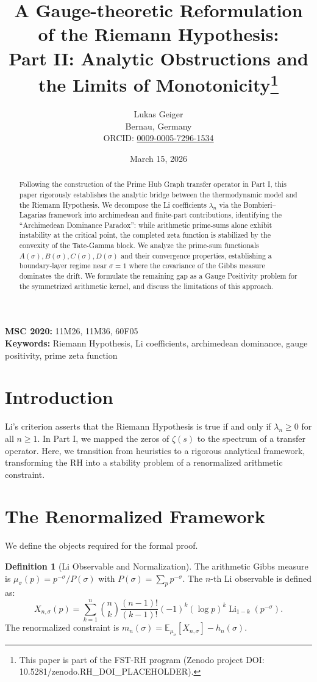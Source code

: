 \documentclass[12pt,a4paper]{article}
\title{A Gauge-theoretic Reformulation of the Riemann Hypothesis:\\ Part II: Analytic Obstructions and the Limits of Monotonicity\thanks{This paper is part of the FST-RH program (Zenodo project DOI: 10.5281/zenodo.RH\_DOI\_PLACEHOLDER).}}
\author{Lukas Geiger\\
\small Bernau, Germany\\
\small ORCID: \href{https://orcid.org/0009-0005-7296-1534}{0009-0005-7296-1534}}
\date{March 15, 2026}
\theoremstyle{definition}
\newtheorem{definition}[theorem]{Definition}
\theoremstyle{remark}
\begin{document}
\maketitle

\begin{abstract}
Following the construction of the Prime Hub Graph transfer operator in Part I, this paper rigorously establishes the analytic bridge between the thermodynamic model and the Riemann Hypothesis. We decompose the Li coefficients $\lambda_n$ via the Bombieri--Lagarias framework into archimedean and finite-part contributions, identifying the ``Archimedean Dominance Paradox'': while arithmetic prime-sums alone exhibit instability at the critical point, the completed zeta function is stabilized by the convexity of the Tate-Gamma block. We analyze the prime-sum functionals $A(\sigma), B(\sigma), C(\sigma), D(\sigma)$ and their convergence properties, establishing a boundary-layer regime near $\sigma = 1$ where the covariance of the Gibbs measure dominates the drift. We formulate the remaining gap as a Gauge Positivity problem for the symmetrized arithmetic kernel, and discuss the limitations of this approach.
\end{abstract}

\noindent\textbf{MSC 2020:} 11M26, 11M36, 60F05\\
\textbf{Keywords:} Riemann Hypothesis, Li coefficients, archimedean dominance, gauge positivity, prime zeta function

\tableofcontents

\section{Introduction}

Li's criterion asserts that the Riemann Hypothesis is true if and only if $\lambda_n \ge 0$ for all $n \ge 1$. In Part I, we mapped the zeros of $\zeta(s)$ to the spectrum of a transfer operator. Here, we transition from heuristics to a rigorous analytical framework, transforming the RH into a stability problem of a renormalized arithmetic constraint.

\section{The Renormalized Framework}

We define the objects required for the formal proof. 

\begin{definition}[Li Observable and Normalization]
The arithmetic Gibbs measure is $\mu_\sigma(p) = p^{-\sigma}/P(\sigma)$ with $P(\sigma) = \sum_p p^{-\sigma}$. The $n$-th Li observable is defined as:
\[ X_{n,\sigma}(p) = \sum_{k=1}^{n} \binom{n}{k} \frac{(n-1)!}{(k-1)!} (-1)^k (\log p)^k \operatorname{Li}_{1-k}(p^{-\sigma}). \]
The renormalized constraint is $m_n(\sigma) = \mathbb{E}_{\mu_\sigma}[X_{n,\sigma}] - h_n(\sigma)$.
\end{definition}
\end{document}

